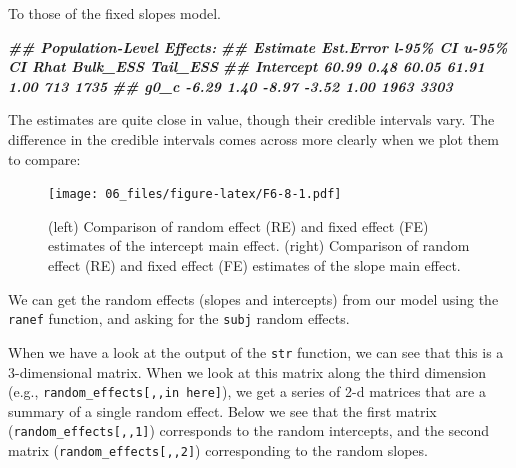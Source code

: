 \documentclass[
]{book}
\newenvironment{Shaded}{\begin{snugshade}}{\end{snugshade}}
\newcommand{\CommentTok}[1]{\textcolor[rgb]{0.56,0.35,0.01}{\textit{#1}}}
\newcommand{\DocumentationTok}[1]{\textcolor[rgb]{0.56,0.35,0.01}{\textbf{\textit{#1}}}}
\newcommand{\FunctionTok}[1]{\textcolor[rgb]{0.00,0.00,0.00}{#1}}
\newcommand{\NormalTok}[1]{#1}
\newcommand{\OtherTok}[1]{\textcolor[rgb]{0.56,0.35,0.01}{#1}}
\newcommand{\SpecialCharTok}[1]{\textcolor[rgb]{0.00,0.00,0.00}{#1}}
\begin{document}
To those of the fixed slopes model.

\begin{Shaded}
\begin{Highlighting}[]
\DocumentationTok{\#\# Population{-}Level Effects: }
\DocumentationTok{\#\#            Estimate Est.Error l{-}95\% CI u{-}95\% CI Rhat Bulk\_ESS Tail\_ESS}
\DocumentationTok{\#\# Intercept     60.99      0.48    60.05    61.91 1.00      713     1735}
\DocumentationTok{\#\# g0\_c          {-}6.29      1.40    {-}8.97    {-}3.52 1.00     1963     3303}
\end{Highlighting}
\end{Shaded}

The estimates are quite close in value, though their credible intervals vary. The difference in the credible intervals comes across more clearly when we plot them to compare:

\begin{figure}
\centering
\texttt{[image: 06\_files/figure-latex/F6-8-1.pdf]}
\caption{\label{fig:F6-8}(left) Comparison of random effect (RE) and fixed effect (FE) estimates of the intercept main effect. (right) Comparison of random effect (RE) and fixed effect (FE) estimates of the slope main effect.}
\end{figure}

We can get the random effects (slopes and intercepts) from our model using the \texttt{ranef} function, and asking for the \texttt{subj} random effects.

\begin{Shaded}
\end{Shaded}

When we have a look at the output of the \texttt{str} function, we can see that this is a 3-dimensional matrix. When we look at this matrix along the third dimension (e.g., \texttt{random\_effects{[},,in\ here{]}}), we get a series of 2-d matrices that are a summary of a single random effect. Below we see that the first matrix (\texttt{random\_effects{[},,1{]}}) corresponds to the random intercepts, and the second matrix (\texttt{random\_effects{[},,2{]}}) corresponding to the random slopes.
\end{document}
